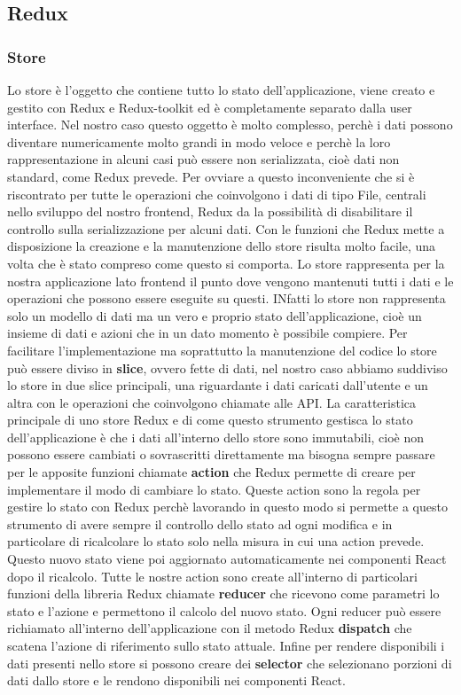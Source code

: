 \subsection{Redux}
\subsubsection{Store}
Lo store è l'oggetto che contiene tutto lo stato dell'applicazione, viene creato e gestito con Redux e Redux-toolkit ed è completamente separato dalla user interface.
Nel nostro caso questo oggetto è molto complesso, perchè i dati possono diventare numericamente molto grandi in modo veloce e perchè la loro rappresentazione in alcuni casi può
essere non serializzata, cioè dati non standard, come Redux prevede. Per ovviare a questo inconveniente che si è riscontrato per tutte le operazioni che coinvolgono i dati di tipo File,
centrali nello sviluppo del nostro frontend, Redux da la possibilità di disabilitare il controllo sulla serializzazione per alcuni dati. Con le funzioni che Redux mette a disposizione
la creazione e la manutenzione dello store risulta molto facile, una volta che è stato compreso come questo si comporta. Lo store rappresenta per la nostra applicazione lato frontend
il punto dove vengono mantenuti tutti i dati e le operazioni che possono essere eseguite su questi. INfatti lo store non rappresenta solo un modello di dati ma un vero e proprio stato dell'applicazione,
cioè un insieme di dati e azioni che in un dato momento è possibile compiere. Per facilitare l'implementazione ma soprattutto la manutenzione del codice lo store può essere diviso in
\textbf{slice}, ovvero fette di dati, nel nostro caso abbiamo suddiviso lo store in due slice principali, una riguardante i dati caricati dall'utente e un altra con le operazioni che
coinvolgono chiamate alle API. La caratteristica principale di uno store Redux e di come questo strumento gestisca lo stato dell'applicazione è che i dati all'interno dello store sono
immutabili, cioè non possono essere cambiati o sovrascritti direttamente ma bisogna sempre passare per le apposite funzioni chiamate \textbf{action} che Redux permette di creare per implementare
il modo di cambiare lo stato. Queste action sono la regola per gestire lo stato con Redux perchè lavorando in questo modo si permette a questo strumento di avere sempre il controllo dello stato ad ogni modifica
e in particolare di ricalcolare lo stato solo nella misura in cui una action prevede. Questo nuovo stato viene poi aggiornato automaticamente nei componenti React dopo il ricalcolo.
Tutte le nostre action sono create all'interno di particolari funzioni della libreria Redux chiamate \textbf{reducer} che ricevono come parametri lo stato e l'azione e permettono il
calcolo del nuovo stato. Ogni reducer può essere richiamato all'interno dell'applicazione con il metodo Redux \textbf{dispatch} che scatena l'azione di riferimento sullo stato attuale.
Infine per rendere disponibili i dati presenti nello store si possono creare dei \textbf{selector} che selezionano porzioni di dati dallo store e le rendono disponibili nei componenti React.

